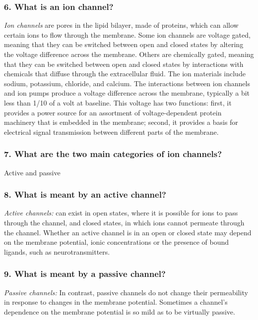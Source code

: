 \subsubsection{6. What is an ion channel?}

\textit{Ion channels} are pores in the lipid bilayer, made of proteins, which can allow certain ions to flow through the membrane. Some ion channels are voltage gated, meaning that they can be switched between open and closed states by altering the voltage difference across the membrane. Others are chemically gated, meaning that they can be switched between open and closed states by interactions with chemicals that diffuse through the extracellular fluid. The ion materials include sodium, potassium, chloride, and calcium. The interactions between ion channels and ion pumps produce a voltage difference across the membrane, typically a bit less than 1/10 of a volt at baseline. This voltage has two functions: first, it provides a power source for an assortment of voltage-dependent protein machinery that is embedded in the membrane; second, it provides a basis for electrical signal transmission between different parts of the membrane.

\subsubsection{7. What are the two main categories of ion channels?}

Active and passive

\subsubsection{8. What is meant by an active channel?}

\textit{Active channels:} can exist in open states, where it is possible for ions to pass through the channel, and closed states, in which ions cannot permeate through the channel. Whether an active channel is in an open or closed state may depend on the membrane potential, ionic concentrations or the presence of bound ligands, such as neurotransmitters.

\subsubsection{9. What is meant by a passive channel?}

\textit{Passive channels:} In contrast, passive channels do not change their permeability in response to changes in the membrane potential. Sometimes a channel’s dependence on the membrane potential is so mild as to be virtually passive.

